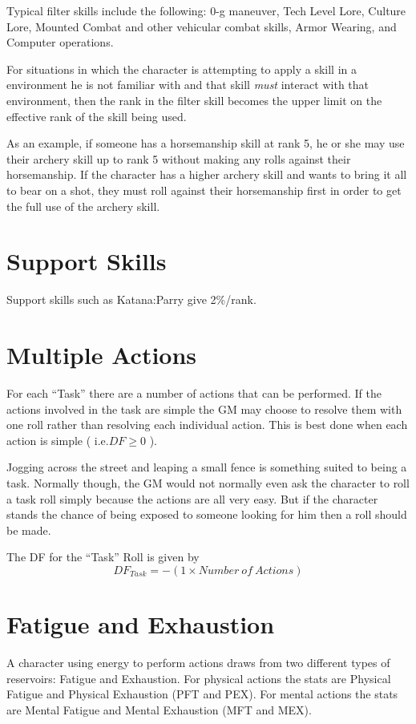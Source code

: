 Typical filter skills include the following: 0-g maneuver, Tech 
Level Lore, Culture Lore, Mounted Combat and other vehicular combat 
skills, Armor Wearing, and Computer operations.

For situations in which the character is attempting to apply a skill 
in a environment he is not familiar with and that skill {\em must }
interact with that environment, then the rank in the filter skill 
becomes the upper limit on the effective rank of the skill being 
used.

As an example, if someone has a horsemanship skill at rank 5, he or she
may use their archery skill up to rank 5 without making any rolls
against their horsemanship. If the character has a higher archery skill
and wants to bring it all to bear on a shot, they must roll against
their horsemanship first in order to get the full use of the archery
skill.

\section{Support Skills}

Support skills such as Katana:Parry give 2\%/rank.

\section{Multiple Actions}

For each ``Task'' there are a number of actions that can be performed. 
If the actions involved in the task are simple the GM may choose to
resolve  them with one roll rather than resolving each individual
action. This is best done when each action is simple ( i.e.\(  DF \geq
0\) ). 

Jogging across the street and leaping a small fence is something suited
to being a task. Normally though, the GM would not normally even ask
the character to roll a task roll simply because the actions are all
very easy. But if the character stands the chance of being exposed to
someone looking for him then a roll should be made. 

The DF for the ``Task'' Roll is given by \[ DF_{Task} =  - ( 1
\times {Number\ of\ Actions }) \]  

\section{Fatigue and Exhaustion}

A character using energy to perform actions draws from two different 
types of reservoirs: Fatigue and Exhaustion. For physical actions the 
stats are Physical Fatigue and Physical Exhaustion (PFT and PEX). For mental
actions the stats are Mental Fatigue and Mental Exhaustion (MFT and MEX).

